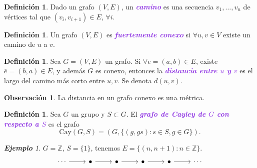 \documentclass{article}
\theoremstyle{definition}
\newtheorem{definition}[theorem]{Definición}
\newtheorem*{obs}{Observación}
\theoremstyle{remark}
\newtheorem{example}[theorem]{\textbf{Ejemplo}}
\numberwithin{equation}{section}
\newcommand{\Z}{\mathbb{Z}}
\renewcommand{\bar}{\overline}
\newcommand{\Cay}{\mathrm{Cay}}
\newcommand{\wea}[1]{\textcolor{BlueViolet}{\textbf{\emph{#1}}}}
\begin{document}
\begin{definition}
  Dado un grafo $(V,E)$, un \wea{camino} es una secuencia $v_1,\dots,v_n$ de vértices tal que $(v_i,v_{i+1}) \in E$, $\forall i$.
\end{definition}

\begin{definition}
  Un grafo $(V,E)$ es \wea{fuertemente conexo} si $\forall u,v \in V$ existe un camino de $u$ a $v$.
\end{definition}

\begin{definition}
  Sea $G = (V,E)$ un grafo. Si $\forall e = (a,b) \in E$, existe $\bar e = (b,a) \in E$, y además $G$ es conexo, entonces la \wea{distancia entre $u$ y $v$} es el largo del camino más corto entre $u,v$. Se denota $d(u,v)$.
\end{definition}

\begin{obs}
  La distancia en un grafo conexo es una métrica.
\end{obs}

\begin{definition}
  Sea $G$ un grupo y $S \subset G$. El \wea{grafo de Cayley de $G$ con respecto a $S$} es el grafo
  \[\Cay(G,S) = (G,\{(g,gs) : s \in S , g \in G\}).\]
\end{definition}

\begin{example}
  $G = \Z$, $S=\{1\}$, tenemos $E = \{(n,n+1) : n \in \Z\}$.
  \[\begin{tikzcd}
    \cdots & \bullet & \bullet & \bullet & \bullet & \cdots
    \arrow[from=1-1, to=1-2]
    \arrow[from=1-2, to=1-3]
    \arrow[from=1-3, to=1-4]
    \arrow[from=1-4, to=1-5]
    \arrow[from=1-5, to=1-6]
  \end{tikzcd}\]
\end{example}
\end{document}
